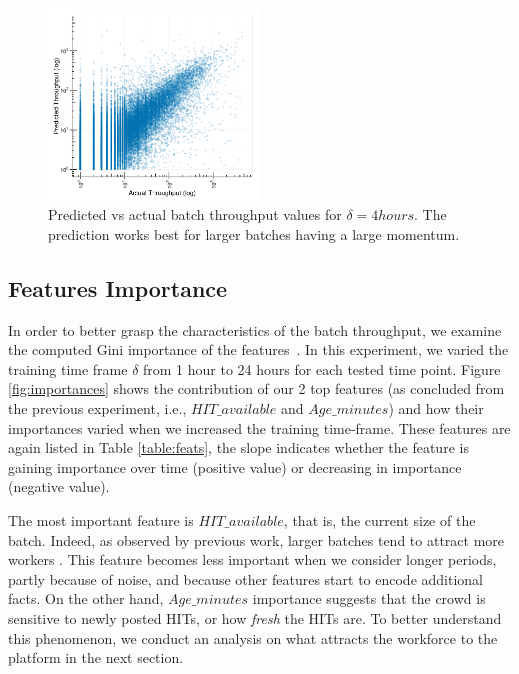 \begin{figure}[t!]
	\centering
		\includegraphics[width=0.5\textwidth]{figures/predictions_3}
	\caption{Predicted vs actual batch throughput values for $\delta=4hours$. The prediction works best for larger batches having a large momentum.}
	\label{fig:pred}
\end{figure}

\subsection{Features Importance}

In order to better grasp the characteristics of the batch throughput, we examine the computed Gini importance of the  features~\cite{breiman}. 
In this experiment, we varied the training time frame $\delta$ from 1 hour to 24 hours for each tested time point. 
Figure \ref{fig:importances} shows the contribution of our 2 top features (as concluded from the previous experiment, i.e., $HIT\_available$ and $Age\_minutes$) and how their importances varied when we increased the training time-frame. These features are again listed in Table \ref{table:feats}, the slope indicates whether the feature is gaining importance over time (positive value) or decreasing in importance (negative value).

The most important feature is $HIT\_available$, that is, the current size of the batch. Indeed, as observed by previous work, larger batches tend to attract more workers \cite{mturk,crowddb}. This feature becomes less important when we consider longer periods, partly because of noise, and because other features start to encode additional facts.
On the other hand, $Age\_minutes$ importance suggests that the crowd is sensitive to newly posted HITs, or how \emph{fresh} the HITs are. 
To better understand this phenomenon, we conduct an analysis on what attracts the workforce to the platform in the next section.

